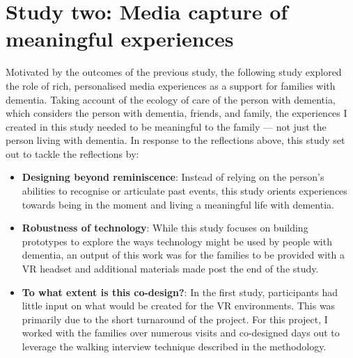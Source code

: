 \section{Study two: Media capture of meaningful experiences}
\label{studyTwo}
Motivated by the outcomes of the previous study, the following study explored the role of rich, personalised media experiences as a support for families with dementia. Taking account of the ecology of care of the person with dementia, which considers the person with dementia, friends, and family, the experiences I created in this study needed to be meaningful to the family — not just the person living with dementia. In response to the reflections above, this study set out to tackle the reflections by:

\begin{itemize}
    
    \item \textbf{Designing beyond reminiscence}: Instead of relying on the person's abilities to recognise or articulate past events, this study orients experiences towards being in the moment and living a meaningful life with dementia.

    \item \textbf{Robustness of technology}: While this study focuses on building prototypes to explore the ways technology might be used by people with dementia, an output of this work was for the families to be provided with a VR headset and additional materials made post the end of the study.

    \item \textbf{To what extent is this co-design?}: In the first study, participants had little input on what would be created for the VR environments. This was primarily due to the short turnaround of the project. For this project, I worked with the families over numerous visits and co-designed days out to leverage the walking interview technique described in the methodology.
\end{itemize}

